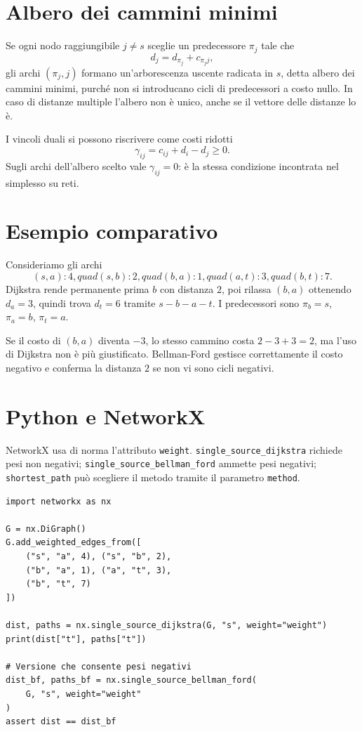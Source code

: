 \documentclass[11pt,a4paper]{article}
\begin{document}
\section{Albero dei cammini minimi}

Se ogni nodo raggiungibile $j\neq s$ sceglie un predecessore $\pi_j$ tale che
\[
d_j=d_{\pi_j}+c_{\pi_jj},
\]
gli archi $(\pi_j,j)$ formano un'arborescenza uscente radicata in $s$, detta albero dei cammini minimi, purché non si introducano cicli di predecessori a costo nullo. In caso di distanze multiple l'albero non è unico, anche se il vettore delle distanze lo è.

I vincoli duali si possono riscrivere come costi ridotti
\[
\gamma_{ij}=c_{ij}+d_i-d_j\geq0.
\]
Sugli archi dell'albero scelto vale $\gamma_{ij}=0$: è la stessa condizione incontrata nel simplesso su reti.

\section{Esempio comparativo}

Consideriamo gli archi
\[
(s,a):4,quad (s,b):2,quad (b,a):1,quad (a,t):3,quad (b,t):7.
\]
Dijkstra rende permanente prima $b$ con distanza $2$, poi rilassa $(b,a)$ ottenendo $d_a=3$, quindi trova $d_t=6$ tramite $s-b-a-t$. I predecessori sono $\pi_b=s$, $\pi_a=b$, $\pi_t=a$.

Se il costo di $(b,a)$ diventa $-3$, lo stesso cammino costa $2-3+3=2$, ma l'uso di Dijkstra non è più giustificato. Bellman-Ford gestisce correttamente il costo negativo e conferma la distanza $2$ se non vi sono cicli negativi.

\section{Python e NetworkX}

\begin{networkxbox}
NetworkX usa di norma l'attributo \texttt{weight}. \texttt{single\_source\_dijkstra} richiede pesi non negativi; \texttt{single\_source\_bellman\_ford} ammette pesi negativi; \texttt{shortest\_path} può scegliere il metodo tramite il parametro \texttt{method}.
\end{networkxbox}

\begin{lstlisting}[style=python,caption={Distanze, cammini e controllo con NetworkX}]
import networkx as nx

G = nx.DiGraph()
G.add_weighted_edges_from([
    ("s", "a", 4), ("s", "b", 2),
    ("b", "a", 1), ("a", "t", 3),
    ("b", "t", 7)
])

dist, paths = nx.single_source_dijkstra(G, "s", weight="weight")
print(dist["t"], paths["t"])

# Versione che consente pesi negativi
dist_bf, paths_bf = nx.single_source_bellman_ford(
    G, "s", weight="weight"
)
assert dist == dist_bf
\end{lstlisting}
\end{document}
